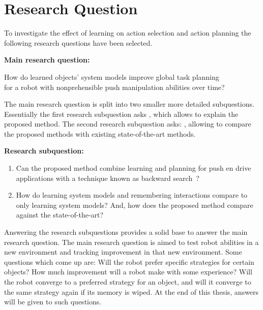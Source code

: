 \section{Research Question}%
\label{sec:research_question}
To investigate the effect of learning on action selection and action planning the following research questions have been selected.\bs

\textbf{Main research question:}
\begin{center}%
\label{researchquestion:main}
\large
How do learned objects' system models improve global task planning\\for a robot with nonprehensible push manipulation abilities over time?
\end{center}

The main research question is split into two smaller more detailed subquestions. Essentially the first research subquestion asks , which allows to explain the proposed method. The second research subquestion asks: , allowing to compare the proposed methods with existing state-of-the-art methods.\bs

\textbf{Research subquestion:}
\begin{enumerate}
    \item\label{researchsubquestion:does_it_work} Can the proposed method combine learning and planning for push en drive applications with a technique known as backward search~\cite{krontiris_dealing_2015}?
    \item\label{researchsubquestion:does_it_compare} How do learning system models and remembering interactions compare to only learning system models? And, how does the proposed method compare against the state-of-the-art?
\end{enumerate}

Answering the research subquestions provides a solid base to answer the main research question. The main research question is aimed to test robot abilities in a new environment and tracking improvement in that new environment. Some questions which come up are: Will the robot prefer specific strategies for certain objects? How much improvement will a robot make with some experience? Will the robot converge to a preferred strategy for an object, and will it converge to the same strategy again if its memory is wiped. At the end of this thesis, answers will be given to such questions.\bs


